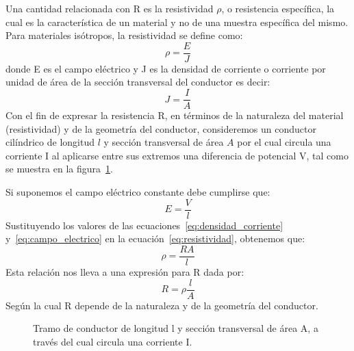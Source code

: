 \documentclass[12pt, a4paper]{article}
\begin{document}
Una cantidad relacionada con R es la resistividad $\rho$, o resistencia específica, la cual es 
la característica de un material y no de una muestra específica del mismo. Para materiales 
isótropos, la resistividad se define como:
\begin{equation}
    \rho = \frac{E}{J}
    \label{eq:resistividad}
\end{equation}
donde E es el campo eléctrico y J es la densidad de corriente o corriente por unidad de área de 
la sección transversal del conductor es decir:
\begin{equation}
    J = \frac{I}{A}
    \label{eq:densidad_corriente}
\end{equation}
Con el fin de expresar la resistencia R, en términos de la naturaleza del material (resistividad) y 
de la geometría del conductor, consideremos un conductor cilíndrico de longitud $l$ y sección 
transversal de área $A$ por el cual circula una corriente I al aplicarse entre sus extremos una 
diferencia de potencial V, tal como se muestra en la figura~\ref{fig:conductor}.

Si suponemos el campo eléctrico constante debe cumplirse que:
\begin{equation}
    E = \frac{V}{l}
    \label{eq:campo_electrico}
\end{equation}
Sustituyendo los valores de las ecuaciones~\eqref{eq:densidad_corriente} 
y~\eqref{eq:campo_electrico} en la ecuación~\eqref{eq:resistividad}, obtenemos que:
\begin{equation}
    \rho = \frac{RA}{l}
    \label{eq:resistividad_geo}
\end{equation}
Esta relación nos lleva a una expresión para R dada por:
\begin{equation}
    R = \rho \frac{l}{A}
\end{equation}
Según la cual R depende de la naturaleza y de la geometría del conductor.

\begin{figure}[H]
    \centering
    \caption{Tramo de conductor de longitud l y sección transversal de área A, a través del cual 
    circula una corriente I.}\label{fig:conductor}
\end{figure}
\end{document}
